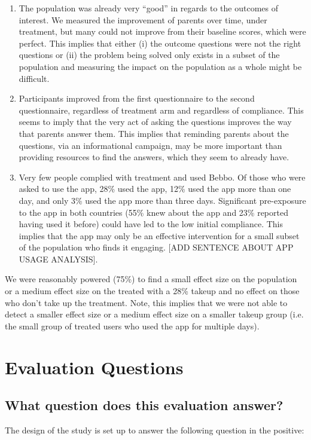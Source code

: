 \documentclass{article}
\begin{document}
\begin{enumerate}
\item The population was already very “good” in regards to the outcomes of interest. We measured the improvement of parents over time, under treatment, but many could not improve from their baseline scores, which were perfect. This implies that either (i) the outcome questions were not the right questions or (ii) the problem being solved only exists in a subset of the population and measuring the impact on the population as a whole might be difficult.
\item Participants improved from the first questionnaire to the second questionnaire, regardless of treatment arm and regardless of compliance. This seems to imply that the very act of asking the questions improves the way that parents answer them. This implies that reminding parents about the questions, via an informational campaign, may be more important than providing resources to find the answers, which they seem to already have.
\item Very few people complied with treatment and used Bebbo. Of those who were asked to use the app, 28\% used the app, 12\% used the app more than one day, and only 3\% used the app more than three days. Significant pre-exposure to the app in both countries (55\% knew about the app and 23\% reported having used it before) could have led to the low initial compliance. This implies that the app may only be an effective intervention for a small subset of the population who finds it engaging. [ADD SENTENCE ABOUT APP USAGE ANALYSIS].
\end{enumerate}

We were reasonably powered (75\%) to find a small effect size on the population or a medium effect size on the treated with a 28\% takeup and no effect on those who don't take up the treatment. Note, this implies that we were not able to detect a smaller effect size or a medium effect size on a smaller takeup group (i.e. the small group of treated users who used the app for multiple days).

\section{Evaluation Questions}

\subsection*{What question does this evaluation answer?}
The design of the study is set up to answer the following question in the positive:
\end{document}
